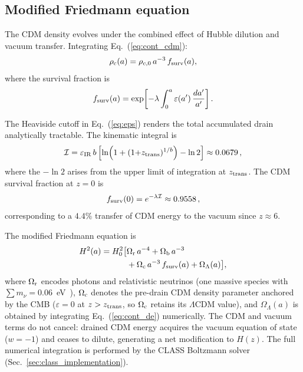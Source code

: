 \documentclass[a4paper,fleqn]{cas-dc}
\newcommand{\eps}{\varepsilon}
\newcommand{\epsIR}{\varepsilon_{\rm IR}}
\newcommand{\ztrans}{z_{\rm trans}}
\newcommand{\fsurv}{f_{\rm surv}}
\newcommand{\Ikin}{\mathcal{I}}
\newcommand{\rhoc}{\rho_{\rm c}}
\newcommand{\Ocdm}{\Omega_{\rm c}}
\newcommand{\OL}{\Omega_\Lambda}
\begin{document}
\subsection{Modified Friedmann equation}
\label{sec:friedmann_eu}

The CDM density evolves under the combined effect of Hubble dilution
and vacuum transfer. Integrating Eq.~(\ref{eq:cont_cdm}):
\begin{equation}
\rhoc(a) = \rho_{c,0}\,a^{-3}\,\fsurv(a),
\label{eq:rho_c}
\end{equation}
where the survival fraction is
\begin{equation}
\fsurv(a) = \exp\!\left[
  -\lambda \int_0^{a}
  \eps(a')\,\frac{da'}{a'}\right].
\label{eq:fsurv}
\end{equation}

The Heaviside cutoff in Eq.~(\ref{eq:eps}) renders the total
accumulated drain analytically tractable. The kinematic integral is
\begin{equation}
\Ikin = \epsIR\,b\left[
  \ln\!\left(1 + (1{+}\ztrans)^{1/b}\right) - \ln 2\right]
  \approx 0.0679\,,
\label{eq:Ikin}
\end{equation}
where the $-\ln 2$ arises from the upper limit of integration at
$\ztrans$. The CDM survival fraction at $z = 0$ is
\begin{equation}
\fsurv(0) = e^{-\lambda\Ikin} \approx 0.9558\,,
\label{eq:fsurv0}
\end{equation}
corresponding to a $4.4\%$ transfer of CDM energy to the vacuum since
$z \approx 6$.

The modified Friedmann equation is
\begin{align}
H^2(a) = H_0^2\big[
  &\Omega_{\rm r}\,a^{-4}
  + \Omega_{\rm b}\,a^{-3}
  \notag \\
  &+ \Ocdm\,a^{-3}\,\fsurv(a)
  + \OL(a)\big],
\label{eq:friedmann}
\end{align}
where $\Omega_{\rm r}$ encodes photons and relativistic neutrinos
(one massive species with $\sum m_\nu = 0.06$~eV~\cite{planck2018}),
$\Ocdm$ denotes the pre-drain CDM density parameter anchored by the
CMB ($\eps = 0$ at $z > \ztrans$, so $\Ocdm$ retains its
$\Lambda$CDM value), and $\OL(a)$ is obtained by integrating
Eq.~(\ref{eq:cont_de}) numerically. The CDM and vacuum terms do not cancel: drained CDM
energy acquires the vacuum equation of state ($w = -1$) and ceases to
dilute, generating a net modification to $H(z)$. The full numerical
integration is performed by the CLASS Boltzmann
solver~\cite{blas2011} (Sec.~\ref{sec:class_implementation}).
\end{document}
